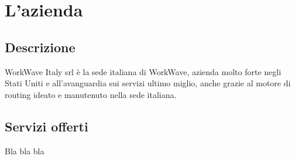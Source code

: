 
\chapter{L'azienda}
\label{cap:azienda}

\section{Descrizione}

WorkWave Italy srl è la sede italiana di WorkWave, azienda molto forte negli Stati Uniti e all’avanguardia sui servizi ultimo miglio, anche grazie al motore di routing ideato e manutenuto nella sede italiana. 

\section{Servizi offerti}

Bla bla bla
